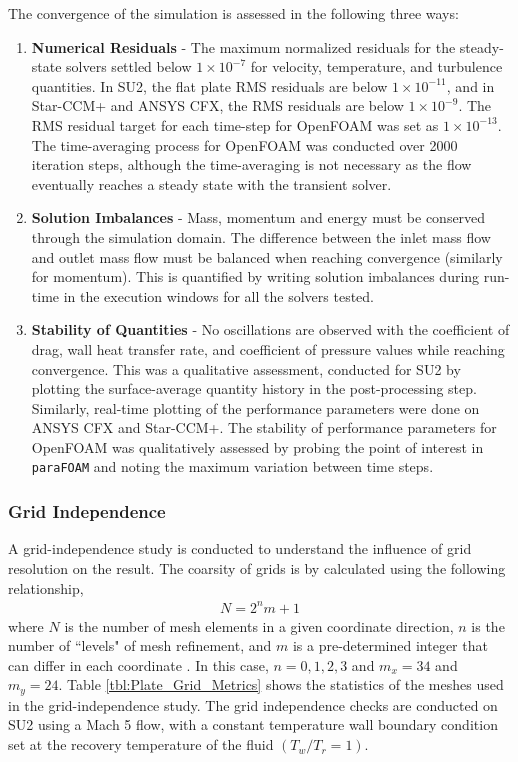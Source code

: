 \documentclass[journal ]{new-aiaa}
\begin{document}
The convergence of the simulation is assessed in the following three ways:
\begin{enumerate}
    \item \textbf{Numerical Residuals} - The maximum normalized residuals for the steady-state solvers settled below $1 \times 10^{-7}$ for velocity, temperature, and turbulence quantities. In SU2, the flat plate RMS residuals are below $1 \times 10^{-11}$, and in Star-CCM+ and ANSYS CFX, the RMS residuals are below $1 \times 10^{-9}$. The RMS residual target for each time-step for OpenFOAM was set as $1 \times 10^{-13}$. The time-averaging process for OpenFOAM was conducted over 2000 iteration steps, although the time-averaging is not necessary as the flow eventually reaches a steady state with the transient solver. 
    \item \textbf{Solution Imbalances} - Mass, momentum and energy must be conserved through the simulation domain. The difference between the inlet mass flow and outlet mass flow must be balanced when reaching convergence (similarly for momentum). This is quantified by writing solution imbalances during run-time in the execution windows for all the solvers tested.
    \item \textbf{Stability of Quantities} - No oscillations are observed with the coefficient of drag, wall heat transfer rate, and coefficient of pressure values while reaching convergence. This was a qualitative assessment, conducted for SU2 by plotting the surface-average quantity history in the post-processing step. 
    Similarly, real-time plotting of the performance parameters were done on ANSYS CFX and Star-CCM+. The stability of performance parameters for OpenFOAM was qualitatively assessed by probing the point of interest in \texttt{paraFOAM} and noting the maximum variation between time steps. 
\end{enumerate}


\subsubsection{Grid Independence}
A grid-independence study is conducted to understand the influence of grid resolution on the result. The coarsity of grids is by calculated using the following relationship,
\begin{align}
    N = 2^{n} m + 1
\end{align}
where $N$ is the number of mesh elements in a given coordinate direction, $n$ is the number of ``levels" of mesh refinement, and $m$ is a pre-determined integer that can differ in each coordinate \cite{NASASpatialValidation}. In this case, $n = 0, 1, 2, 3$ and $m_x = 34$ and $m_y = 24$. Table \ref{tbl:Plate_Grid_Metrics} shows the statistics of the meshes used in the grid-independence study. The grid independence checks are conducted on SU2 using a Mach 5 flow, with a constant temperature wall boundary condition set at the recovery temperature of the fluid $(T_w/T_r = 1)$.
\end{document}
